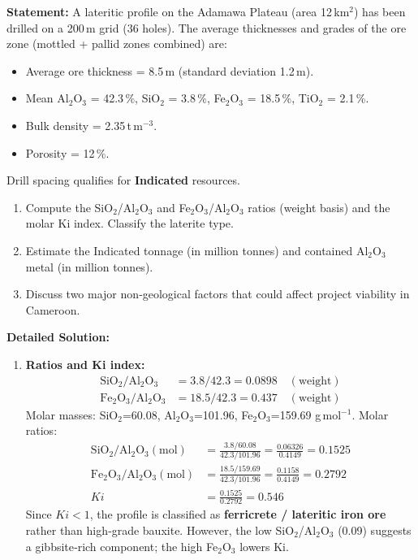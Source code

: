 \documentclass[11pt]{article}
\begin{document}
\begin{exoresolu}
\textbf{Statement:} A lateritic profile on the Adamawa Plateau (area 12\,km$^2$) has been drilled on a 200\,m grid (36 holes). The average thicknesses and grades of the ore zone (mottled + pallid zones combined) are:
\begin{itemize}
\item Average ore thickness = 8.5\,m (standard deviation 1.2\,m).
\item Mean Al$_2$O$_3$ = 42.3\,\%, SiO$_2$ = 3.8\,\%, Fe$_2$O$_3$ = 18.5\,\%, TiO$_2$ = 2.1\,\%.
\item Bulk density = 2.35\,t\,m$^{-3}$.
\item Porosity = 12\,\%.
\end{itemize}
Drill spacing qualifies for \textbf{Indicated} resources. 
\begin{enumerate}
\item Compute the SiO$_2$/Al$_2$O$_3$ and Fe$_2$O$_3$/Al$_2$O$_3$ ratios (weight basis) and the molar Ki index. Classify the laterite type.
\item Estimate the Indicated tonnage (in million tonnes) and contained Al$_2$O$_3$ metal (in million tonnes).
\item Discuss two major non‑geological factors that could affect project viability in Cameroon.
\end{enumerate}
\tcblower
\textbf{Detailed Solution:}
\begin{enumerate}
\item \textbf{Ratios and Ki index:}
\begin{align*}
\text{SiO}_2/\text{Al}_2\text{O}_3 &= 3.8 / 42.3 = 0.0898 \quad (\text{weight})\\
\text{Fe}_2\text{O}_3/\text{Al}_2\text{O}_3 &= 18.5 / 42.3 = 0.437 \quad (\text{weight})
\end{align*}
Molar masses: SiO$_2$=60.08, Al$_2$O$_3$=101.96, Fe$_2$O$_3$=159.69 g\,mol$^{-1}$.
Molar ratios:
\begin{align*}
\text{SiO}_2/\text{Al}_2\text{O}_3 (\text{mol}) &= \frac{3.8/60.08}{42.3/101.96} = \frac{0.06326}{0.4149} = 0.1525\\
\text{Fe}_2\text{O}_3/\text{Al}_2\text{O}_3 (\text{mol}) &= \frac{18.5/159.69}{42.3/101.96} = \frac{0.1158}{0.4149} = 0.2792\\
Ki &= \frac{0.1525}{0.2792} = 0.546
\end{align*}
Since $Ki < 1$, the profile is classified as \textbf{ferricrete / lateritic iron ore} rather than high‑grade bauxite. However, the low SiO$_2$/Al$_2$O$_3$ (0.09) suggests a gibbsite‑rich component; the high Fe$_2$O$_3$ lowers Ki.

\end{enumerate}
\end{exoresolu}
\end{document}

